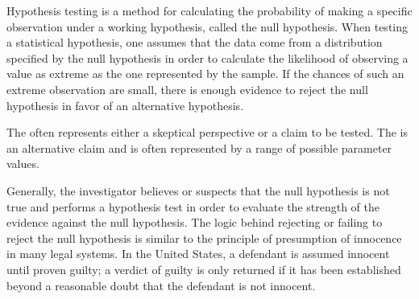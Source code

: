 \begin{spacing}{1.5}
Hypothesis testing is a method for calculating the probability of making a specific observation under a working hypothesis, called the null hypothesis. When testing a statistical hypothesis, one assumes that the data come from a distribution specified by the null hypothesis in order to calculate the likelihood of observing a value as extreme as the one represented by the sample. If the chances of such an extreme observation are small, there is enough evidence to reject the null hypothesis in favor of an alternative hypothesis. 

\begin{termBox}{
		{The  often represents either a skeptical perspective or a claim to be tested. The  is an alternative claim and is often represented by a range of possible parameter values.}}
\end{termBox}

Generally, the investigator believes or suspects that the null hypothesis is not true and performs a hypothesis test in order to evaluate the strength of the evidence against the null hypothesis. The logic behind rejecting or failing to reject the null hypothesis is similar to the principle of presumption of innocence in many legal systems. In the United States, a defendant is assumed innocent until proven guilty; a verdict of guilty is only returned if it has been established beyond a reasonable doubt that the defendant is not innocent.

\end{spacing}
